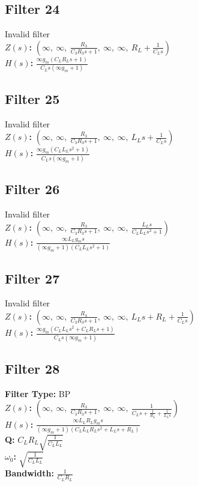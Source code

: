 \documentclass{article}
\begin{document}
\subsection*{Filter 24}
Invalid filter \\ 
\textbf{$Z(s)$:} $\left( \infty, \  \infty, \  \frac{R_{3}}{C_{3} R_{3} s + 1}, \  \infty, \  \infty, \  R_{L} + \frac{1}{C_{L} s}\right)$ \\ 
\textbf{$H(s)$:} $\frac{\infty g_{m} \left(C_{L} R_{L} s + 1\right)}{C_{L} s \left(\infty g_{m} + 1\right)}$ \\ 
\subsection*{Filter 25}
Invalid filter \\ 
\textbf{$Z(s)$:} $\left( \infty, \  \infty, \  \frac{R_{3}}{C_{3} R_{3} s + 1}, \  \infty, \  \infty, \  L_{L} s + \frac{1}{C_{L} s}\right)$ \\ 
\textbf{$H(s)$:} $\frac{\infty g_{m} \left(C_{L} L_{L} s^{2} + 1\right)}{C_{L} s \left(\infty g_{m} + 1\right)}$ \\ 
\subsection*{Filter 26}
Invalid filter \\ 
\textbf{$Z(s)$:} $\left( \infty, \  \infty, \  \frac{R_{3}}{C_{3} R_{3} s + 1}, \  \infty, \  \infty, \  \frac{L_{L} s}{C_{L} L_{L} s^{2} + 1}\right)$ \\ 
\textbf{$H(s)$:} $\frac{\infty L_{L} g_{m} s}{\left(\infty g_{m} + 1\right) \left(C_{L} L_{L} s^{2} + 1\right)}$ \\ 
\subsection*{Filter 27}
Invalid filter \\ 
\textbf{$Z(s)$:} $\left( \infty, \  \infty, \  \frac{R_{3}}{C_{3} R_{3} s + 1}, \  \infty, \  \infty, \  L_{L} s + R_{L} + \frac{1}{C_{L} s}\right)$ \\ 
\textbf{$H(s)$:} $\frac{\infty g_{m} \left(C_{L} L_{L} s^{2} + C_{L} R_{L} s + 1\right)}{C_{L} s \left(\infty g_{m} + 1\right)}$ \\ 
\subsection*{Filter 28}
\textbf{Filter Type:} BP \\ 
\textbf{$Z(s)$:} $\left( \infty, \  \infty, \  \frac{R_{3}}{C_{3} R_{3} s + 1}, \  \infty, \  \infty, \  \frac{1}{C_{L} s + \frac{1}{R_{L}} + \frac{1}{L_{L} s}}\right)$ \\ 
\textbf{$H(s)$:} $\frac{\infty L_{L} R_{L} g_{m} s}{\left(\infty g_{m} + 1\right) \left(C_{L} L_{L} R_{L} s^{2} + L_{L} s + R_{L}\right)}$ \\ 
\textbf{Q:} $C_{L} R_{L} \sqrt{\frac{1}{C_{L} L_{L}}}$ \\ 
\textbf{$\omega_0$:} $\sqrt{\frac{1}{C_{L} L_{L}}}$ \\ 
\textbf{Bandwidth:} $\frac{1}{C_{L} R_{L}}$ \\ 
\end{document}

